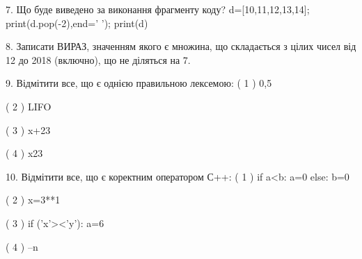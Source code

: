 \documentclass[11pt]{article}
\begin{document}
\vspace{5mm}

7. Що буде виведено за виконання фрагменту коду?
d=[10,11,12,13,14]; print(d.pop(-2),end=' '); print(d)\vspace{5mm}

8. 
Записати ВИРАЗ, значенням якого є множина, що складається з цілих чисел від 12 до 2018 (включно), що не діляться на 7.\vspace{5mm}

9. %
Відмітити все, що є однією правильною лексемою:
( 1 ) 0,5

( 2 ) LIFO

( 3 ) x+23

( 4 ) x23
\vspace{5mm}

10. %
Відмітити все, що є коректним оператором С++:
( 1 ) if a<b: a=0 else: b=0

( 2 ) x=3**1

( 3 ) if ('x'><'y'): a=6

( 4 ) --n
\vspace{5mm}

\newpage
\end{document}
